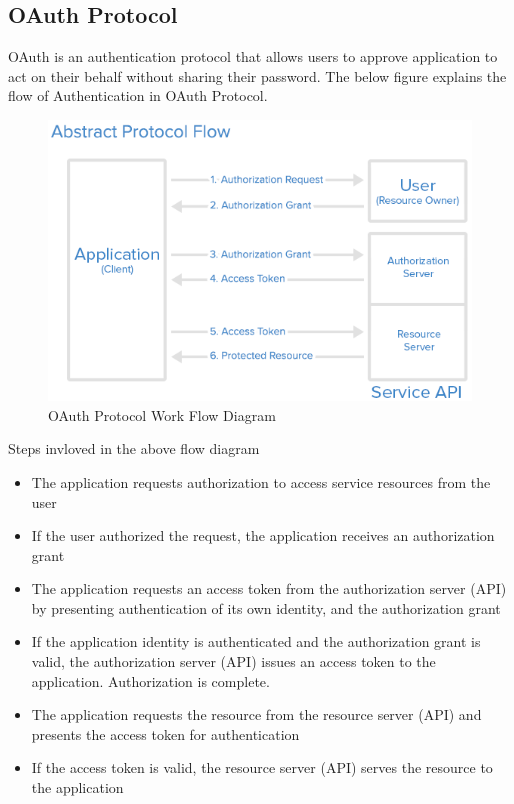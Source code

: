 \documentclass[12pt]{report}
\begin{document}
\subsection{OAuth Protocol}
OAuth is an authentication protocol that allows users to approve application to act on their behalf without sharing their password.
The below figure explains the flow of Authentication in OAuth Protocol.
\begin{figure}[H]
\begin{center}
\includegraphics[scale=0.5]{abstract_flow}
\caption{OAuth Protocol Work Flow Diagram\label{fig:OAuth Protocol Work Flow Diagram}}
\end{center}
\end{figure}
Steps invloved in the above flow diagram
\begin{itemize}
\item The application requests authorization to access service resources from the user
\item If the user authorized the request, the application receives an authorization grant
\item The application requests an access token from the authorization server (API) by presenting authentication of its own identity, and the authorization grant
\item If the application identity is authenticated and the authorization grant is valid, the authorization server (API) issues an access token to the application. Authorization is complete.
\item The application requests the resource from the resource server (API) and presents the access token for authentication
\item If the access token is valid, the resource server (API) serves the resource to the application
\end{itemize}
\end{document}
